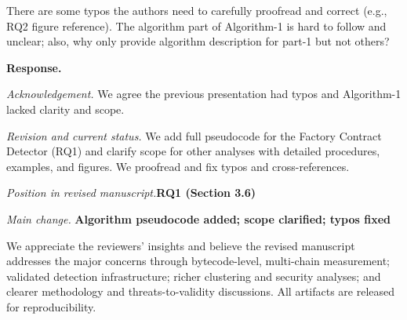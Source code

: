 \documentclass[acmsmall]{acmart}
\begin{document}
	\begin{tcolorbox}
		[commentbox,title=Reviewer \#4 -- Comment 5] There are some typos the authors need to carefully
		proofread and correct (e.g., RQ2 figure reference). The algorithm part of Algorithm-1 is
		hard to follow and unclear; also, why only provide algorithm description for part-1 but not
		others?
	\end{tcolorbox}

	\noindent
	\textbf{Response.}

	\textit{Acknowledgement.} We agree the previous presentation had typos and Algorithm-1 lacked
	clarity and scope.

	\textit{Revision and current status.} We add full pseudocode for the Factory Contract Detector (RQ1)
	and clarify scope for other analyses with detailed procedures, examples, and figures. We
	proofread and fix typos and cross-references.

	\textit{Position in revised manuscript.}{\color{red}\textbf{RQ1 (Section 3.6)}}

	\textit{Main change.}
	{\color{blue}\textbf{Algorithm pseudocode added; scope clarified; typos fixed}}

	\vspace{1em}
	\noindent
	We appreciate the reviewers’ insights and believe the revised manuscript addresses the major concerns
	through bytecode-level, multi-chain measurement; validated detection infrastructure; richer
	clustering and security analyses; and clearer methodology and threats-to-validity discussions.
	All artifacts are released for reproducibility.
\end{document}
